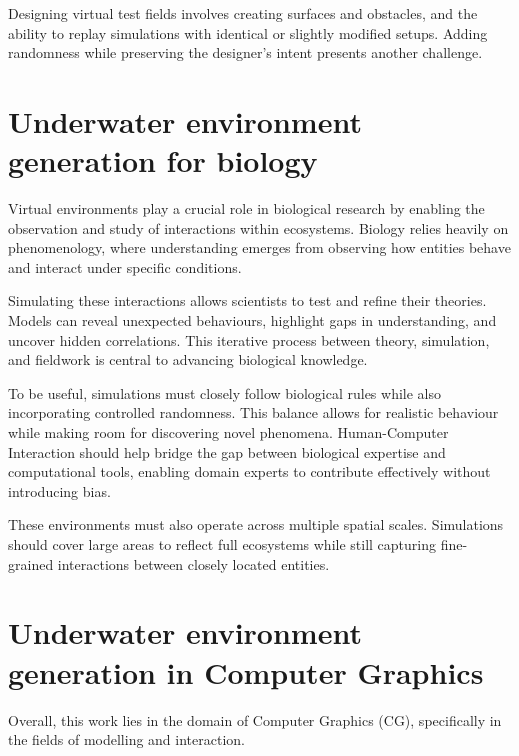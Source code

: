 Designing virtual test fields involves creating surfaces and obstacles, and the ability to replay simulations with identical or slightly modified setups. Adding randomness while preserving the designer's intent presents another challenge. %

\section{Underwater environment generation for biology}

Virtual environments play a crucial role in biological research by enabling the observation and study of interactions within ecosystems. Biology relies heavily on phenomenology, where understanding emerges from observing how entities behave and interact under specific conditions.

Simulating these interactions allows scientists to test and refine their theories. Models can reveal unexpected behaviours, highlight gaps in understanding, and uncover hidden correlations. This iterative process between theory, simulation, and fieldwork is central to advancing biological knowledge.

To be useful, simulations must closely follow biological rules while also incorporating controlled randomness. This balance allows for realistic behaviour while making room for discovering novel phenomena. Human-Computer Interaction should help bridge the gap between biological expertise and computational tools, enabling domain experts to contribute effectively without introducing bias.


These environments must also operate across multiple spatial scales. Simulations should cover large areas to reflect full ecosystems while still capturing fine-grained interactions between closely located entities.

\section{Underwater environment generation in Computer Graphics}

Overall, this work lies in the domain of Computer Graphics (CG), specifically in the fields of modelling and interaction.

